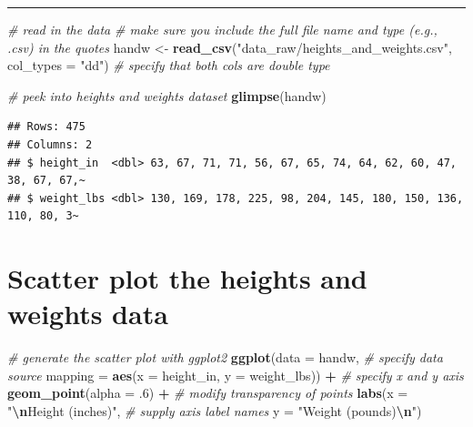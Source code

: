 \documentclass[
]{article}
\newenvironment{Shaded}{\begin{snugshade}}{\end{snugshade}}
\newcommand{\AttributeTok}[1]{\textcolor[rgb]{0.13,0.29,0.53}{#1}}
\newcommand{\CommentTok}[1]{\textcolor[rgb]{0.56,0.35,0.01}{\textit{#1}}}
\newcommand{\DecValTok}[1]{\textcolor[rgb]{0.00,0.00,0.81}{#1}}
\newcommand{\FunctionTok}[1]{\textcolor[rgb]{0.13,0.29,0.53}{\textbf{#1}}}
\newcommand{\NormalTok}[1]{#1}
\newcommand{\OtherTok}[1]{\textcolor[rgb]{0.56,0.35,0.01}{#1}}
\newcommand{\SpecialCharTok}[1]{\textcolor[rgb]{0.81,0.36,0.00}{\textbf{#1}}}
\newcommand{\StringTok}[1]{\textcolor[rgb]{0.31,0.60,0.02}{#1}}
\begin{document}
\begin{center}\rule{0.5\linewidth}{0.5pt}\end{center}

\begin{Shaded}
\begin{Highlighting}[]
\CommentTok{\# read in the data}
\CommentTok{\# make sure you include the full file name and type (e.g., .csv) in the quotes}
\NormalTok{handw }\OtherTok{\textless{}{-}} 
  \FunctionTok{read\_csv}\NormalTok{(}\StringTok{"data\_raw/heights\_and\_weights.csv"}\NormalTok{, }
           \AttributeTok{col\_types =} \StringTok{"dd"}\NormalTok{)                }\CommentTok{\# specify that both cols are \textasciigrave{}double\textasciigrave{} type}


\CommentTok{\# peek into heights and weights dataset}
\FunctionTok{glimpse}\NormalTok{(handw)}
\end{Highlighting}
\end{Shaded}

\begin{verbatim}
## Rows: 475
## Columns: 2
## $ height_in  <dbl> 63, 67, 71, 71, 56, 67, 65, 74, 64, 62, 60, 47, 38, 67, 67,~
## $ weight_lbs <dbl> 130, 169, 178, 225, 98, 204, 145, 180, 150, 136, 110, 80, 3~
\end{verbatim}

\hypertarget{scatter-plot-the-heights-and-weights-data}{%
\section{Scatter plot the heights and weights
data}\label{scatter-plot-the-heights-and-weights-data}}

\begin{Shaded}
\begin{Highlighting}[]
\CommentTok{\# generate the scatter plot with ggplot2}
\FunctionTok{ggplot}\NormalTok{(}\AttributeTok{data =}\NormalTok{ handw,                                    }\CommentTok{\# specify data source}
       \AttributeTok{mapping =} \FunctionTok{aes}\NormalTok{(}\AttributeTok{x =}\NormalTok{ height\_in, }\AttributeTok{y =}\NormalTok{ weight\_lbs)) }\SpecialCharTok{+}  \CommentTok{\# specify x and y axis}
  \FunctionTok{geom\_point}\NormalTok{(}\AttributeTok{alpha =}\NormalTok{ .}\DecValTok{6}\NormalTok{) }\SpecialCharTok{+}                              \CommentTok{\# modify transparency of points}
  \FunctionTok{labs}\NormalTok{(}\AttributeTok{x =} \StringTok{"}\SpecialCharTok{\textbackslash{}n}\StringTok{Height (inches)"}\NormalTok{,                         }\CommentTok{\# supply axis label names}
       \AttributeTok{y =} \StringTok{"Weight (pounds)}\SpecialCharTok{\textbackslash{}n}\StringTok{"}\NormalTok{)}
\end{Highlighting}
\end{Shaded}
\end{document}
